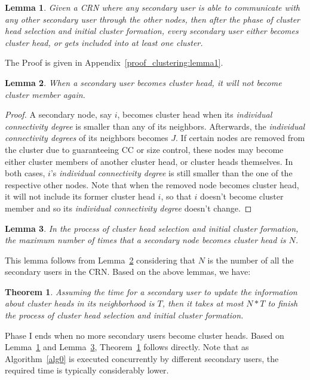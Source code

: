 \documentclass[times]{ettauth}
\theoremstyle{mytheoremstyle}
\newtheorem{theorem}{Theorem}[section]
\theoremstyle{mytheoremstyle}
\theoremstyle{mytheoremstyle}
\newtheorem{lemma}{Lemma}[section]
\begin{document}
\begin{lemma}
\label{clustering:lemma1}
Given a CRN where any secondary user is able to communicate with any other secondary user through the other nodes, then after the phase of cluster head selection and initial cluster formation, every secondary user either becomes cluster head, or gets included into at least one cluster.
\end{lemma}
The Proof is given in Appendix~\ref{proof_clustering:lemma1}.

\begin{lemma}
\label{clustering:lemma2}
When a secondary user becomes cluster head, it will not become cluster member again.
\end{lemma}
\begin{proof}
A secondary node, say $i$, becomes cluster head when its \textit{individual connectivity degree} is smaller than any of its neighbors.
Afterwards, the \textit{individual connectivity degrees} of its neighbors becomes $J$.
If certain nodes are removed from the cluster due to guaranteeing CC or size control, these nodes may become either cluster members of another cluster head, or cluster heads themselves.
In both cases, $i$'s \textit{individual connectivity degree} is still smaller than the one of the respective other nodes.
Note that when the removed node becomes cluster head, it will not include its former cluster head $i$, so that $i$ doesn't become cluster member and so its \textit{individual connectivity degree} doesn't change.
\end{proof}


\begin{lemma}
\label{clustering:lemma3}
In the process of cluster head selection and initial cluster formation, the maximum number of times that a secondary node becomes cluster head is $N$.
\end{lemma}
This lemma follows from Lemma~\ref{clustering:lemma2} considering that $N$ is the number of all the secondary users in the CRN.
Based on the above lemmas, we have:
\begin{theorem}
\label{clustering:theorem}
Assuming the time for a secondary user to update the information about cluster heads in its neighborhood is $T$, then it takes at most $N*T $ to finish the process of cluster head selection and initial cluster formation.
\end{theorem}
Phase I ends when no more secondary users become cluster heads.
Based on Lemma~\ref{clustering:lemma1} and Lemma~\ref{clustering:lemma3}, Theorem~\ref{clustering:theorem} follows directly.
Note that as Algorithm~\ref{alg0} is executed concurrently by different secondary users, the required time is typically considerably lower.
\end{document}
